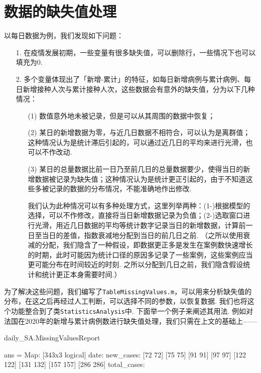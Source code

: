 \documentclass[a4paper, titlepage]{article}
\begin{document}
    \section{数据的缺失值处理}\label{数据的缺失值处理}
        以每日数据为例，我们发现如下问题：
        \begin{enumerate}
            \item [1.] 在疫情发展初期，一些变量有很多缺失值，可以删除行，一些情况下也可以填充为$0$.
            \item [2.] 多个变量体现出了「新增-累计」的特征，如每日新增病例与累计病例、每日新增接种人次与累计接种人次，这些数据会有意外的缺失值，分为以下几种情况：
                \begin{enumerate}
                    \item [(1)] 数值意外地未被记录，但是可以从其周围的数据中恢复；
                    \item [(2)] 某日的新增数据为零，与近几日数据不相符合，可以认为是离群值；这种情况认为是统计滞后引起的，可以通过近几日的平均来进行光滑，也可以不作改动.
                    \item [(3)] 某日的总量数据比前一日乃至前几日的总量数据要少，使得当日的新增数据被记录为缺失值；这种情况认为是统计更正引起的，由于不知道这些多被记录的数据的分布情况，不能准确地作出修改.
                    
                    {\kaishu 我们认为此种情况可以有多种处理方式，这里列举两种：(1-)根据模型的选择，可以不作修改，直接将当日新增数据记录为负值；(2-)选取窗口进行光滑，用近几日数据的平均等统计数字记录当日的新增数据，计算前一日至当日的差值，指数衰减地分配到当日的前几日之前. （之所以使用衰减的分配，我们隐含了一种假设，即数据更正多是发生在案例数快速增长的时期，此时可能因为统计口径的原因多记录了一些案例，这些案例应当更可能分布在时间较近的时刻. 之所以分配到几日之前，我们隐含假设统计和统计更正本身需要时间.）}
                \end{enumerate}
        \end{enumerate}
        为了解决这些问题，我们编写了\texttt{TableMissingValues.m}，可以用来分析缺失值的分布，在这之后再经过人工判断，可以选择不同的参数，以恢复数据. 我们也将这个功能整合到了类\texttt{StatisticsAnalysis}中. 下面举一个例子来阐述其用法. 例如对法国在2020年的新增与累计病例数进行缺失值处理，我们只需在上文的基础上——
\begin{spacing}{0.7}
\begin{matlabcode}
daily_SA.MissingValuesReport
\end{matlabcode}
\begin{matlaboutput}
ans = 
        Map: [343x3 logical]
       date: {}
  new_cases: {[72 72] [75 75] [91 91] [97 97] [122 122] [131 132] [157 157] [286 286]}
total_cases: {}
\end{matlaboutput}
\end{spacing}
\end{document}
